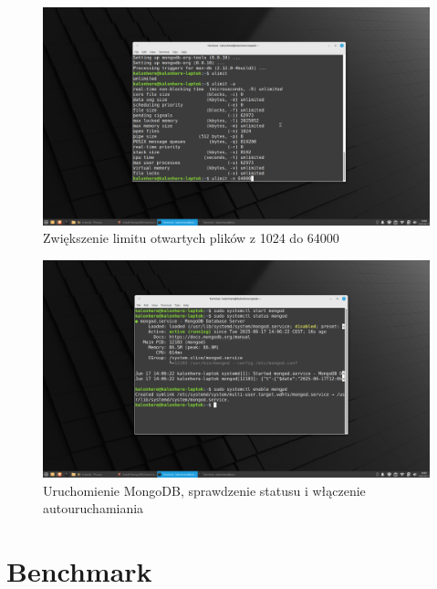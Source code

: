 \documentclass[11pt]{article}
\begin{document}
		\begin{figure}
			\includegraphics[width=\textwidth]{7_zmiana_ustawien_dotyczacych_plikow.png}
			\caption{Zwiększenie limitu otwartych plików z 1024 do 64000}
		\end{figure}
		\begin{figure}
			\includegraphics[width=\textwidth]{8_uruchomienie_sprawdzenie_i_aktywacja_autouruchamiania_mongodb.png}
			\caption{Uruchomienie MongoDB, sprawdzenie statusu i włączenie autouruchamiania}
		\end{figure}
\section{Benchmark}
\end{document}
